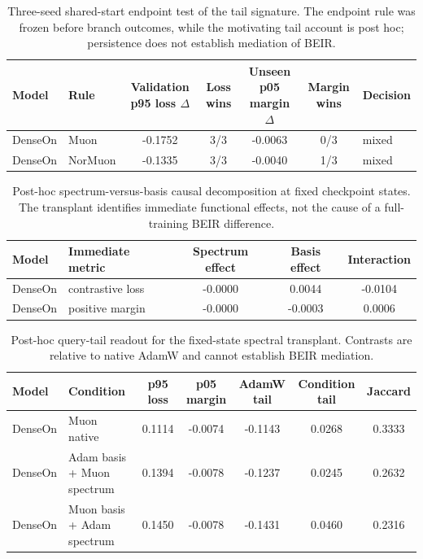 \begin{table}[t]
\centering
\small
\begin{tabular}{llccccl}
\toprule
Model & Rule & Validation p95 loss $\Delta$ & Loss wins & Unseen p05 margin $\Delta$ & Margin wins & Decision \\
\midrule
DenseOn & Muon & -0.1752 & 3/3 & -0.0063 & 0/3 & mixed \\
DenseOn & NorMuon & -0.1335 & 3/3 & -0.0040 & 1/3 & mixed \\
\bottomrule
\end{tabular}
\caption{Three-seed shared-start endpoint test of the tail signature. The endpoint rule was frozen before branch outcomes, while the motivating tail account is post hoc; persistence does not establish mediation of BEIR.}
\label{tab:tail-persistence-results}
\end{table}

\begin{table}[t]
\centering
\small
\begin{tabular}{llccc}
\toprule
Model & Immediate metric & Spectrum effect & Basis effect & Interaction \\
\midrule
DenseOn & contrastive loss & -0.0000 & 0.0044 & -0.0104 \\
DenseOn & positive margin & -0.0000 & -0.0003 & 0.0006 \\
\bottomrule
\end{tabular}
\caption{Post-hoc spectrum-versus-basis causal decomposition at fixed checkpoint states. The transplant identifies immediate functional effects, not the cause of a full-training BEIR difference.}
\label{tab:spectral-factorial-results}
\end{table}

\begin{table}[t]
\centering
\small
\begin{tabular}{llccccc}
\toprule
Model & Condition & p95 loss & p05 margin & AdamW tail & Condition tail & Jaccard \\
\midrule
DenseOn & Muon native & 0.1114 & -0.0074 & -0.1143 & 0.0268 & 0.3333 \\
DenseOn & Adam basis + Muon spectrum & 0.1394 & -0.0078 & -0.1237 & 0.0245 & 0.2632 \\
DenseOn & Muon basis + Adam spectrum & 0.1450 & -0.0078 & -0.1431 & 0.0460 & 0.2316 \\
\bottomrule
\end{tabular}
\caption{Post-hoc query-tail readout for the fixed-state spectral transplant. Contrasts are relative to native AdamW and cannot establish BEIR mediation.}
\label{tab:spectral-tail-results}
\end{table}
